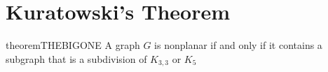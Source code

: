 \documentclass{article}
\begin{document}
%		
%			
%
%		
%
%
%

\section{Kuratowski's Theorem}
\begin{restatable}[Kuratowski]{theorem}{THEBIGONE}\label{THEBIGONE}
	A graph $G$ is nonplanar if and only if it contains a subgraph that is a subdivision of $K_{3,3}$ or $K_5$
\end{restatable}
\end{document}
